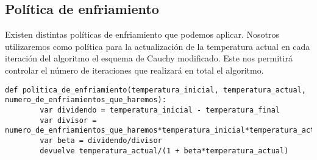 \begin{minipage}{\textwidth}
	\subsection{Política de enfriamiento}

	Existen distintas políticas de enfriamiento que podemos aplicar.
	Nosotros utilizaremos como política para la actualización de la temperatura actual en cada
	iteración del algoritmo el esquema de Cauchy modificado. Este nos permitirá controlar el número de iteraciones
	que realizará en total el algoritmo.

	\begin{lstlisting}[mathescape=true,caption={Función que define la política de enfriamiento para el algoritmo de Enfriamiento Simulado.},captionpos=b]
	def politica_de_enfriamiento(temperatura_inicial, temperatura_actual, numero_de_enfriamientos_que_haremos):
		var dividendo = temperatura_inicial - temperatura_final
		var divisor = numero_de_enfriamientos_que_haremos*temperatura_inicial*temperatura_actual
		var beta = dividendo/divisor
		devuelve temperatura_actual/(1 + beta*temperatura_actual)
	\end{lstlisting}
\end{minipage}